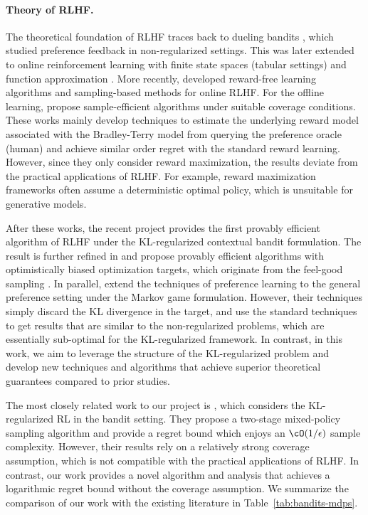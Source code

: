 \paragraph{Theory of RLHF.} The theoretical foundation of RLHF traces back to dueling bandits \citep[e.g.,][]{yue2012k,saha2021optimal,bengs2021preference}, which studied preference feedback in non-regularized settings. This was later extended to online reinforcement learning with finite state spaces (tabular settings) and function approximation \citep{xu2020preference, novoseller2020dueling, pacchiano2021dueling, chen2022human}. More recently, \citet{zhan2023query, wu2023making} developed reward-free learning algorithms and sampling-based methods for online RLHF. For the offline learning,  \citet{zhu2023principled, zhan2023provable, li2023reinforcement, zhong2024dpo, huang2024correcting} propose sample-efficient algorithms under suitable coverage conditions. These works mainly develop techniques to estimate the underlying reward model associated with the Bradley-Terry model from querying the preference oracle (human) and achieve similar order regret with the standard reward learning. However, since they only consider reward maximization, the results deviate from the practical applications of RLHF. For example, reward maximization frameworks often assume a deterministic optimal policy, which is unsuitable for generative models.

After these works, the recent project \citet{xiong2024iterative} provides the first provably efficient algorithm of RLHF under the KL-regularized contextual bandit formulation. The result is further refined in \citep{xie2024exploratory} and \citet{xie2024exploratory, liu2024provably, cen2024value} propose provably efficient algorithms with optimistically biased optimization targets, which originate from the feel-good sampling \citep{zhang2022feel}. In parallel, \citet{wang2023rlhf, ye2024theoretical} extend the techniques of preference learning to the general preference setting under the Markov game formulation. However, their techniques simply discard the KL divergence in the target, and use the standard techniques to get results that are similar to the non-regularized problems, which are essentially sub-optimal for the KL-regularized framework. In contrast, in this work, we aim to leverage the structure of the KL-regularized problem and develop new techniques and algorithms that achieve superior theoretical guarantees compared to prior studies.

The most closely related work to our project is \citet{zhao2024sharp}, which considers the KL-regularized RL in the bandit setting. They propose a two-stage mixed-policy sampling algorithm and provide a regret bound which enjoys an $\cO(1 / \epsilon)$ sample complexity. However, their results rely on a relatively strong coverage assumption, which is not compatible with the practical applications of RLHF. In contrast, our work provides a novel algorithm and analysis that achieves a logarithmic regret bound without the coverage assumption. We summarize the comparison of our work with the existing literature in Table~\ref{tab:bandits-mdps}.


